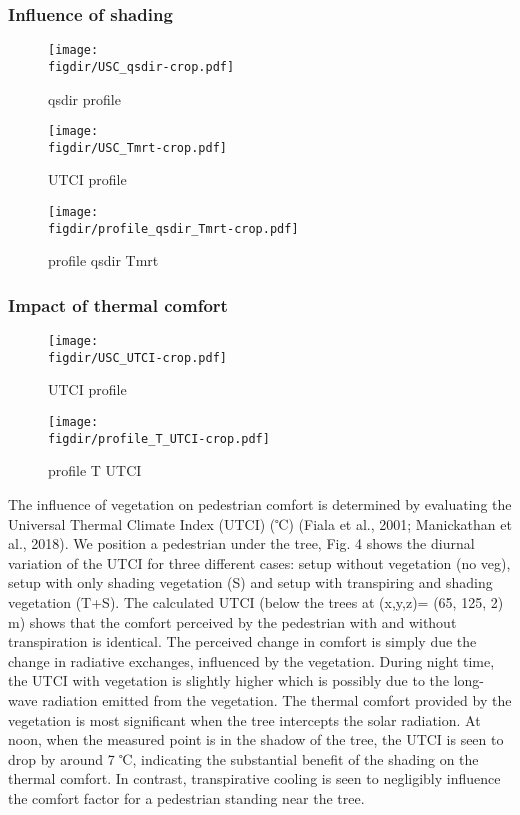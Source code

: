 \subsubsection*{Influence of shading}

\begin{sidewaysfigure}[p]
	\centering
	\texttt{[image: \\figdir/USC\_qsdir-crop.pdf]}
	\caption{qsdir profile}
	\label{fig:USC_qrdir}
\end{sidewaysfigure}

\begin{sidewaysfigure}[p]
	\centering
	\texttt{[image: \\figdir/USC\_Tmrt-crop.pdf]}
	\caption{UTCI profile}
	\label{fig:USC_UTCI}
\end{sidewaysfigure}


\begin{figure}[t]
	\centering
	\texttt{[image: \\figdir/profile\_qsdir\_Tmrt-crop.pdf]}
	\caption{profile qsdir Tmrt}
	\label{fig:profile_qsdir_Tmrt}
\end{figure}

\subsubsection*{Impact of thermal comfort}

\begin{sidewaysfigure}[p]
	\centering
	\texttt{[image: \\figdir/USC\_UTCI-crop.pdf]}
	\caption{UTCI profile}
	\label{fig:USC_Tmrt}
\end{sidewaysfigure}


\begin{figure}[t]
	\centering
	\texttt{[image: \\figdir/profile\_T\_UTCI-crop.pdf]}
	\caption{profile T UTCI}
	\label{fig:profile_T_UTCI}
\end{figure}


The influence of vegetation on pedestrian comfort is determined by evaluating the Universal Thermal Climate Index (UTCI) (℃) (Fiala et al., 2001; Manickathan et al., 2018). We position a pedestrian under the tree, Fig. 4 shows the diurnal variation of the UTCI for three different cases: setup without vegetation (no veg), setup with only shading vegetation (S) and setup with transpiring and shading vegetation (T+S). The calculated UTCI (below the trees at (x,y,z)= (65, 125, 2) m) shows that the comfort perceived by the pedestrian with and without transpiration is identical. The perceived change in comfort is simply due the change in radiative exchanges, influenced by the vegetation. During night time, the UTCI with vegetation is slightly higher which is possibly due to the long-wave radiation emitted from the vegetation. The thermal comfort provided by the vegetation is most significant when the tree intercepts the solar radiation. At noon, when the measured point is in the shadow of the tree, the UTCI is seen to drop by around 7 ℃, indicating the substantial benefit of the shading on the thermal comfort. In contrast, transpirative cooling is seen to negligibly influence the comfort factor for a pedestrian standing near the tree.

